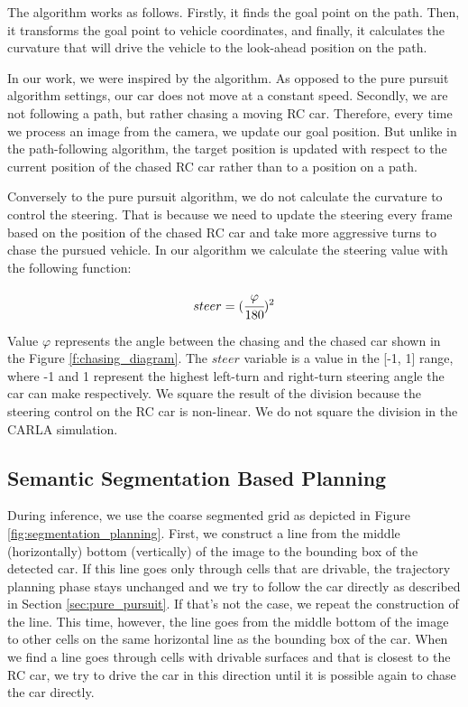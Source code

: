 \documentclass{ctuthesis/ctuthesis}
\begin{document}
The algorithm works as follows. Firstly, it finds the goal point on the path. Then, it transforms the goal point to vehicle coordinates, and finally, it calculates the curvature that will drive the vehicle to the look-ahead position on the path. \par


In our work, we were inspired by the algorithm. As opposed to the pure pursuit algorithm settings, our car does not move at a constant speed. Secondly, we are not following a path, but rather chasing a moving RC car. Therefore, every time we process an image from the camera, we update our goal position. But unlike in the path-following algorithm, the target position is updated with respect to the current position of the chased RC car rather than to a position on a path. \par
Conversely to the pure pursuit algorithm, we do not calculate the curvature to control the steering. That is because we need to update the steering every frame based on the position of the chased RC car and take more aggressive turns to chase the pursued vehicle. In our algorithm we calculate the steering value with the following function:

\begin{equation}steer = (\cfrac{\varphi}{\textrm{180}})^{2}\end{equation}

Value $\varphi$ represents the angle between the chasing and the chased car shown in the Figure \ref{f:chasing_diagram}. The $steer$ variable is a value in the [-1, 1] range, where -1 and 1 represent the highest left-turn and right-turn steering angle the car can make respectively. We square the result of the division because the steering control on the RC car is non-linear. We do not square the division in the CARLA simulation.




\subsection{Semantic Segmentation Based Planning}
During inference, we use the coarse segmented grid as depicted in Figure \ref{fig:segmentation_planning}. First, we construct a line from the middle (horizontally) bottom (vertically) of the image to the bounding box of the detected car. If this line goes only through cells that are drivable, the trajectory planning phase stays unchanged and we try to follow the car directly as described in Section \ref{sec:pure_pursuit}. If that's not the case, we repeat the construction of the line. This time, however, the line goes from the middle bottom of the image to other cells on the same horizontal line as the bounding box of the car. When we find a line goes through cells with drivable surfaces and that is closest to the RC car, we try to drive the car in this direction until it is possible again to chase the car directly.
\end{document}
